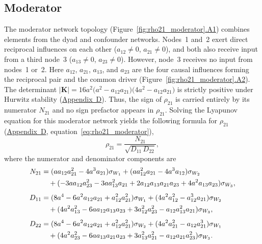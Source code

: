\documentclass[12pt]{article}
\begin{document}
\clearpage
\subsection*{Moderator}

The moderator network topology
(Figure~\ref{fig:rho21_moderator}\hyperref[fig:moderator_A1]{.A1})
combines elements from the dyad and confounder networks. Nodes~1
and~2 exert direct reciprocal influences on each other
($a_{12}\neq0$, $a_{21}\neq0$), and both also receive input
from a third node~3 ($a_{13}\neq0$, $a_{23}\neq0$). However, node~3 receives no input from nodes~1 or~2.
Here $a_{12}$, $a_{21}$, $a_{13}$, and $a_{23}$ are the four
causal influences forming the reciprocal pair and the common
driver (Figure~\ref{fig:rho21_moderator}\hyperref[fig:moderator_A2]{.A2}).
The determinant $|\mathbf{K}|=16a^2\bigl(a^2-a_{12}a_{21}\bigr)
\bigl(4a^2-a_{12}a_{21}\bigr)$ is strictly positive under
Hurwitz stability (\hyperref[app:appD]{Appendix~D}). Thus, the
sign of $\rho_{21}$ is carried entirely by its numerator
$N_{21}$ and no sign prefactor appears in $\rho_{21}$.
Solving the Lyapunov equation for this moderator network
yields the following formula for $\rho_{21}$ (\hyperref[app:appD]{Appendix~D},
equation~\ref{eq:rho21_moderator}),
\begin{equation}
\rho_{21} = \frac{N_{21}}{\sqrt{D_{11}\,D_{22}}},
\label{eq:rho21_moderator_main}
\end{equation}
where the numerator and denominator components are
\begin{align}
N_{21} &=
  (aa_{12}a_{21}^2-4a^3a_{21})\sigma_{W_1}
  +(aa_{12}^2a_{21}-4a^3a_{12})\sigma_{W_2} \notag\\
  &\quad+(-3aa_{12}a_{23}^2-3aa_{13}^2a_{21}
    +2a_{12}a_{13}a_{21}a_{23}
    +4a^2a_{13}a_{23})\sigma_{W_3},
\label{eq:N21_mod}\\[4pt]
D_{11} &=
  (8a^4-6a^2a_{12}a_{21}+a_{12}^2a_{21}^2)\sigma_{W_1}
  +(4a^2a_{12}^2-a_{12}^3a_{21})\sigma_{W_2} \notag\\
  &\quad+(4a^2a_{13}^2-6aa_{12}a_{13}a_{23}
    +3a_{12}^2a_{23}^2-a_{12}a_{13}^2a_{21})\sigma_{W_3},
\label{eq:D11_mod}\\[4pt]
D_{22} &=
  (8a^4-6a^2a_{12}a_{21}+a_{12}^2a_{21}^2)\sigma_{W_2}
  +(4a^2a_{21}^2-a_{12}a_{21}^3)\sigma_{W_1} \notag\\
  &\quad+(4a^2a_{23}^2-6aa_{13}a_{21}a_{23}
    +3a_{13}^2a_{21}^2-a_{12}a_{21}a_{23}^2)\sigma_{W_3}.
\label{eq:D22_mod}
\end{align}
\end{document}
